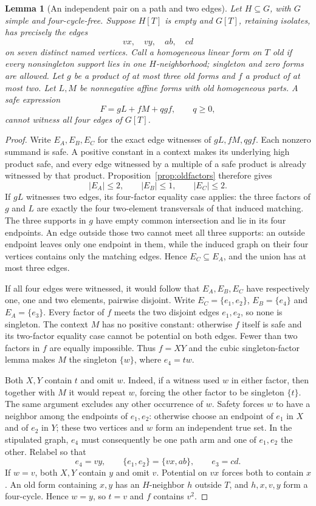 \documentclass[11pt]{article}
\newtheorem{lemma}[theorem]{Lemma}
\theoremstyle{definition}
\theoremstyle{remark}
\begin{document}
\begin{lemma}[An independent pair on a path and two edges]\label{lem:pathindependentpair}
Let $H\subseteq G$, with $G$ simple and four-cycle-free. Suppose $H[T]$ is empty and $G[T]$, retaining isolates, has precisely the edges
\[
 vx,\quad vy,\quad ab,\quad cd
\]
on seven distinct named vertices. Call a homogeneous linear form on $T$ old if every nonsingleton support lies in one $H$-neighborhood; singleton and zero forms are allowed. Let $g$ be a product of at most three old forms and $f$ a product of at most two. Let $L,M$ be nonnegative affine forms with old homogeneous parts. A safe expression
\[
 F=gL+fM+qgf,\qquad q\ge0,
\]
cannot witness all four edges of $G[T]$.
\end{lemma}
\begin{proof}
Write $E_A,E_B,E_C$ for the exact edge witnesses of $gL,fM,qgf$. Each nonzero summand is safe. A positive constant in a context makes its underlying high product safe, and every edge witnessed by a multiple of a safe product is already witnessed by that product. Proposition~\ref{prop:oldfactors} therefore gives
\[
 |E_A|\le2,\qquad |E_B|\le1,\qquad |E_C|\le2.
\]
If $gL$ witnesses two edges, its four-factor equality case applies: the three factors of $g$ and $L$ are exactly the four two-element transversals of that induced matching. The three supports in $g$ have empty common intersection and lie in its four endpoints. An edge outside those two cannot meet all three supports: an outside endpoint leaves only one endpoint in them, while the induced graph on their four vertices contains only the matching edges. Hence $E_C\subseteq E_A$, and the union has at most three edges.

If all four edges were witnessed, it would follow that $E_A,E_B,E_C$ have respectively one, one and two elements, pairwise disjoint. Write $E_C=\{e_1,e_2\}$, $E_B=\{e_4\}$ and $E_A=\{e_3\}$. Every factor of $f$ meets the two disjoint edges $e_1,e_2$, so none is singleton. The context $M$ has no positive constant: otherwise $f$ itself is safe and its two-factor equality case cannot be potential on both edges. Fewer than two factors in $f$ are equally impossible. Thus $f=XY$ and the cubic singleton-factor lemma makes $M$ the singleton $\{w\}$, where $e_4=tw$.

Both $X,Y$ contain $t$ and omit $w$. Indeed, if a witness used $w$ in either factor, then together with $M$ it would repeat $w$, forcing the other factor to be singleton $\{t\}$. The same argument excludes any other occurrence of $w$. Safety forces $w$ to have a neighbor among the endpoints of $e_1,e_2$: otherwise choose an endpoint of $e_1$ in $X$ and of $e_2$ in $Y$; these two vertices and $w$ form an independent true set. In the stipulated graph, $e_4$ must consequently be one path arm and one of $e_1,e_2$ the other. Relabel so that
\[
 e_4=vy,\qquad\{e_1,e_2\}=\{vx,ab\},\qquad e_3=cd.
\]
If $w=v$, both $X,Y$ contain $y$ and omit $v$. Potential on $vx$ forces both to contain $x$. An old form containing $x,y$ has an $H$-neighbor $h$ outside $T$, and $h,x,v,y$ form a four-cycle. Hence $w=y$, so $t=v$ and $f$ contains $v^2$.


\end{proof}
\end{document}
